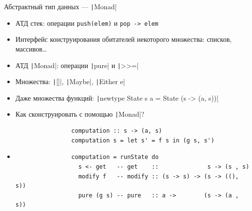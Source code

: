     \begin{frame}[fragile]{Абстрактный тип данных --- \texttt|Monad|}
        \vspace{-0.5em}
        \begin{itemize}
            \item[\eg] АТД стек: операции \texttt{push(elem)} и \texttt{pop -> elem}
            \item Интерфейс конструирования обитателей некоторого множества: списков, массивов\ldots
            \item АТД \texttt|Monad|: операции \texttt|pure| и \texttt|>>=|
            \item[\eg] Множества: \texttt|[]|, \texttt|Maybe|, \texttt|Either e|
            \item[\eg] Даже множества функций: \texttt|newtype State s a = State (s -> (a, s))|
            \item[\todo] Как сконструировать с помощью \texttt|Monad|?
            \begin{verbatim}
                computation :: s -> (a, s)
                computation s = let s' = f s in (g s, s')
            \end{verbatim}
            \item[\answer] \pause
            \begin{verbatim}
                computation = runState do
                  s <- get   -- get    ::              s -> (s , s)
                  modify f   -- modify :: (s -> s) -> (s -> ((), s))
                  pure (g s) -- pure   :: a ->        (s -> (a , s))
            \end{verbatim}
        \end{itemize}
    \end{frame}

